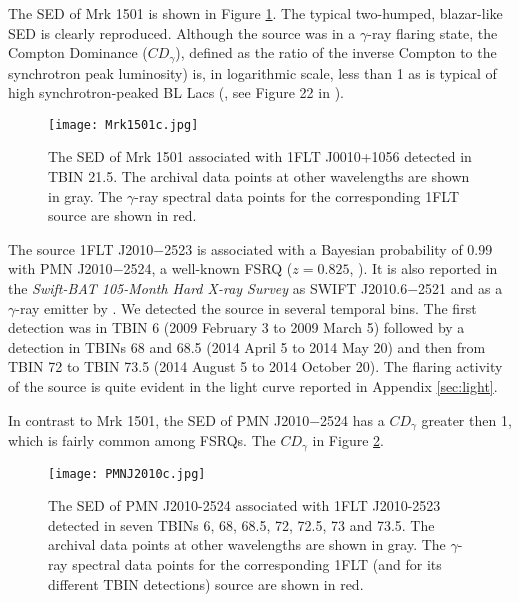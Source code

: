 \documentclass{aastex62}
\begin{document}
The SED of Mrk 1501 is shown in Figure \ref{figure:MRK1501}. The typical two-humped, blazar-like SED is clearly reproduced. Although the source was in a $\gamma$-ray flaring state, the Compton Dominance ($CD_{\gamma}$), defined as the ratio of the inverse Compton to the synchrotron peak luminosity) is, in logarithmic scale, less than 1 as is typical of high synchrotron-peaked BL Lacs (\citealt{abdo2010spectral}, see Figure 22 in  \citealt{giommi2012simultaneous}).
\begin{figure}[hbt!]
    \centering
    \texttt{[image: Mrk1501c.jpg]}
    \caption{The SED of Mrk 1501 associated with 1FLT J0010+1056 detected in TBIN 21.5. The archival data points at other wavelengths are shown in gray. The $\gamma$-ray spectral data points for the corresponding 1FLT source are shown in red.}\label{figure:MRK1501}
\end{figure}

The source 1FLT J2010$-$2523 is associated with a Bayesian probability of 0.99 with PMN J2010$-$2524, a well-known FSRQ ($z= 0.825$, \citealt{massaro20155th}). It is also reported in the \textit{Swift-BAT 105-Month Hard X-ray Survey} as SWIFT J2010.6$-$2521 and as a $\gamma$-ray emitter by \citet{2019ApJ...881..154P}.
We detected the source in several temporal bins. The first detection was in TBIN 6 (2009 February  3 to 2009  March 5) followed by a detection in TBINs 68 and 68.5 (2014 April  5 to  2014  May 20) and then from TBIN 72 to TBIN 73.5 (2014 August 5 to 2014  October 20). The flaring activity of the source is quite evident in the light curve reported in Appendix \ref{sec:light}.

In contrast to Mrk 1501, the SED of PMN J2010$-$2524 has a $CD_{\gamma}$ greater then 1, which is fairly common among FSRQs. The $CD_{\gamma}$ in Figure \ref{figure:PMN2010}.
\begin{figure}[hbt!]
    \centering
    \texttt{[image: PMNJ2010c.jpg]}
    \caption{The SED of PMN J2010-2524 associated with 1FLT J2010-2523 detected in seven TBINs 6, 68, 68.5, 72, 72.5, 73 and 73.5. The archival data points at other wavelengths are shown in gray. The $\gamma$-ray spectral data points for the corresponding 1FLT (and for its different TBIN detections) source are shown in red.
    }\label{figure:PMN2010}
\end{figure}
\end{document}

